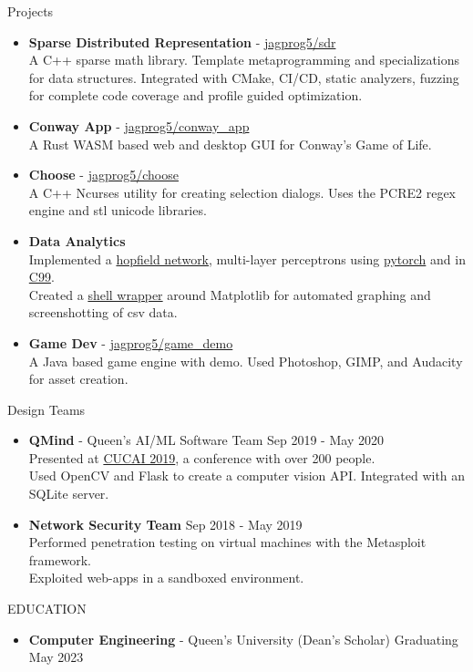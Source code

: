 \documentclass{resume} %
\begin{document}
\begin{rSection}{Projects}
    \begin{itemize}
        \item {\bf Sparse Distributed Representation} - \href{https://github.com/jagprog5/SDR/}{jagprog5/sdr}\\
        A C++ sparse math library. Template metaprogramming and specializations for data structures. Integrated with CMake, CI/CD, static analyzers, fuzzing for complete code coverage and profile guided optimization.
        \item {\bf Conway App} - \href{https://github.com/jagprog5/conway_app/}{jagprog5/conway\_app}\\
        A Rust WASM based web and desktop GUI for Conway's Game of Life.
        \item {\bf Choose} - \href{https://github.com/jagprog5/choose/}{jagprog5/choose}\\
        A C++ Ncurses utility for creating selection dialogs.
        Uses the PCRE2 regex engine and stl unicode libraries.
        \item {\bf Data Analytics}\\
        Implemented a \href{https://github.com/jagprog5/hopfield}{hopfield network}, multi-layer perceptrons using \href{https://github.com/jagprog5/mlp}{pytorch} and in \href{https://github.com/jagprog5/CNeuralNet}{C99}.\\
        Created a \href{https://github.com/jagprog5/CSV-Plotter}{shell wrapper} around Matplotlib for automated graphing and screenshotting of csv data. 
        \item {\bf Game Dev} - \href{https://github.com/jagprog5/GameDemo}{jagprog5/game\_demo}\\
        A Java based game engine with demo. Used Photoshop, GIMP, and Audacity for asset creation.
    \end{itemize}
\end{rSection}

\begin{rSection}{Design Teams}
    \begin{itemize}
        \item {\bf QMind} - Queen's AI/ML Software Team \hfill {Sep 2019 - May 2020}\\
        Presented at \href{https://medium.com/qmind-ai/cucai2019-c9d5f848f5c}{CUCAI 2019}, a conference with over 200 people.\\
        Used OpenCV and Flask to create a computer vision API.
        Integrated with an SQLite server.
        \item {\bf Network Security Team} \hfill {Sep 2018 - May 2019}\\
        Performed penetration testing on virtual machines with the Metasploit framework.\\
        Exploited web-apps in a sandboxed environment.
\end{itemize}
\end{rSection}

\begin{rSection}{EDUCATION}
    \begin{itemize}
        \item {\bf Computer Engineering} - Queen's University (Dean's Scholar) \hfill {Graduating May 2023}
    \end{itemize}
\end{rSection}
\end{document}
